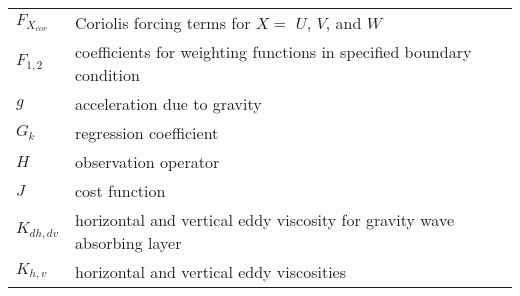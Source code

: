 \begin{tabular}{ l p{5.5in} }
$F_{X_{cor}}$  & Coriolis forcing terms for $X = $ $U$, $V$, and $W$  \\
$F_{1,2}$      & coefficients for weighting functions in specified boundary condition \\
$g$            & acceleration due to gravity \\
$G_k$          & regression coefficient \\
$H$            & observation operator \\
$J$            & cost function \\
$K_{dh,dv}$    & horizontal and vertical eddy viscosity for gravity wave absorbing layer \\
$K_{h,v}$      & horizontal and vertical eddy viscosities \\
\end{tabular}

